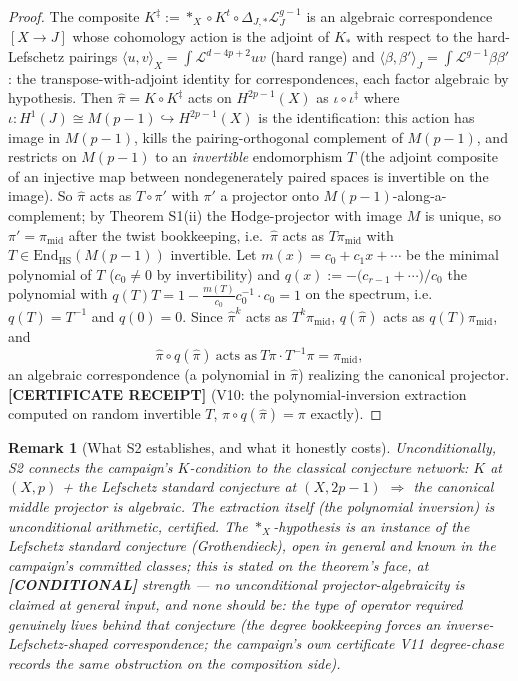 \documentclass[11pt]{article}
\newtheorem{remark}[theorem]{Remark}
\newcommand{\CERT}{\textbf{[CERTIFICATE RECEIPT]}}
\newcommand{\COND}{\textbf{[CONDITIONAL]}}
\newcommand{\End}{\mathrm{End}}
\begin{document}
\begin{proof}
The composite $K^{\ddagger}:=\ast_X\circ K^{t}\circ
\Delta_{J,*}\mathcal L_{J}^{g-1}$ is an algebraic correspondence
$[X\to J]$ whose cohomology action is the adjoint of $K_{*}$ with respect to
the hard-Lefschetz pairings $\langle
u,v\rangle_X=\int\mathcal L^{d-4p+2}uv$ (hard range) and
$\langle\beta,\beta'\rangle_J=\int\mathcal L^{g-1}\beta\beta'$: the
transpose-with-adjoint identity for correspondences, each factor algebraic
by hypothesis. Then $\hat\pi=K\circ K^{\ddagger}$ acts on $H^{2p-1}(X)$ as
$\iota\circ\iota^{\ddagger}$ where $\iota\colon H^{1}(J)\cong
M(p-1)\hookrightarrow H^{2p-1}(X)$ is the identification: this action has
image in $M(p-1)$, kills the pairing-orthogonal complement of $M(p-1)$, and
restricts on $M(p-1)$ to an \emph{invertible} endomorphism $T$ (the adjoint
composite of an injective map between nondegenerately paired spaces is
invertible on the image). So $\hat\pi$ acts as $T\circ\pi'$ with $\pi'$ a
projector onto $M(p-1)$-along-a-complement; by Theorem S1(ii) the
Hodge-projector with image $M$ is unique, so $\pi'=\pi_{\mathrm{mid}}$ after
the twist bookkeeping, i.e.\ $\hat\pi$ acts as $T\pi_{\mathrm{mid}}$ with
$T\in\End_{\mathrm{HS}}(M(p-1))$ invertible. Let $m(x)=c_0+c_1x+\cdots$ be
the minimal polynomial of $T$ ($c_0\ne0$ by invertibility) and
$q(x):=-\bigl(c_{r-1}+\cdots\bigr)/c_0$ the polynomial with
$q(T)T=1-\frac{m(T)}{c_0}c_0^{-1}\!\cdot c_0=1$ on the spectrum, i.e.\
$q(T)=T^{-1}$ and $q(0)=0$. Since $\hat\pi^{k}$ acts as $T^{k}\pi_{\mathrm{mid}}$,
$q(\hat\pi)$ acts as $q(T)\pi_{\mathrm{mid}}$, and
\[
\hat\pi\circ q(\hat\pi)\ \text{acts as}\ T\pi\cdot T^{-1}\pi=\pi_{\mathrm{mid}},
\]
an algebraic correspondence (a polynomial in $\hat\pi$) realizing the
canonical projector. \CERT{} (V10: the polynomial-inversion extraction
computed on random invertible $T$, $\hat\pi\circ q(\hat\pi)=\pi$ exactly).
\end{proof}

\begin{remark}[What S2 establishes, and what it honestly costs]
Unconditionally, S2 connects the campaign's $K$-condition to the classical
conjecture network: \emph{$K$ at $(X,p)$ + the Lefschetz standard conjecture
at $(X,2p-1)$ $\Rightarrow$ the canonical middle projector is algebraic.}
The extraction itself (the polynomial inversion) is unconditional
arithmetic, certified. The $\ast_X$-hypothesis is an instance of the
Lefschetz standard conjecture (Grothendieck), open in general and known in
the campaign's committed classes; this is stated on the theorem's face, at
\COND{} strength --- no unconditional projector-algebraicity is claimed at
general input, and none should be: the type of operator required genuinely
lives behind that conjecture (the degree bookkeeping forces an
inverse-Lefschetz-shaped correspondence; the campaign's own certificate V11
degree-chase records the same obstruction on the composition side).
\end{remark}
\end{document}
